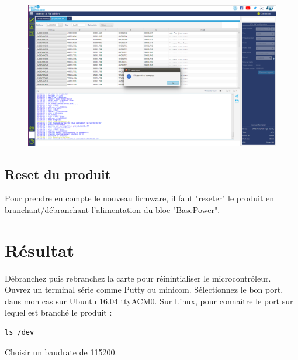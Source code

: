 \documentclass{article}
\begin{document}
\begin{figure}[H]
\begin{center}
\advance\leftskip-3cm
\advance\rightskip-3cm
\includegraphics[keepaspectratio=true,scale=0.3]{downloaded.png}

\label{visina8}
\end{center}\end{figure}
\subsection{Reset du produit}
Pour prendre en compte le nouveau firmware, il faut "reseter" le produit en branchant/débranchant l'alimentation du bloc "BasePower".




\section{Résultat}

Débranchez puis rebranchez la carte pour réinintialiser le microcontrôleur.\\
Ouvrez un terminal série comme Putty ou minicom.
Sélectionnez le bon port, dans mon cas sur Ubuntu 16.04 ttyACM0.
Sur Linux, pour connaître le port sur lequel est branché le produit :

\begin{verbatim}
ls /dev

\end{verbatim}

Choisir un baudrate de 115200.
\end{document}

